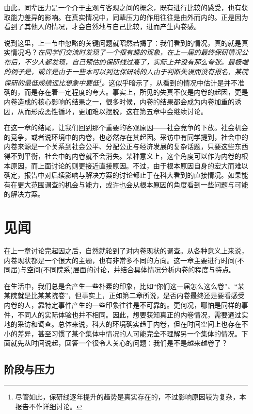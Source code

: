 \documentclass[UTF8,a4paper,fontset=windows,11pt,openany]{ctexbook}
\begin{document}
由此，同辈压力是一个介于主观与客观之间的概念，既有进行比较的感受，也有获取能力差异的影响。在真实情况中，同辈压力的作用往往是由外而内的。正是因为看到了其他人的情况，才会自然地与自己比较，进而产生内卷感。

说到这里，上一节中忽略的关键问题就昭然若揭了：我们看到的情况，真的就是真实情况吗？\emph{在同学们交流时发现了一个很有趣的现象，在上一届的最终保研情况公布后，不少人都发现，自己预估的保研线过高了，实际上并没有那么夸张。最极端的例子是，或许是由于一些本可以到达保研线的人由于判断失误而没有报名，某院保研的最低成绩远比想象中要低\footnote{尽管如此，保研线逐年提升的趋势是真实存在的，不过影响原因较为复杂，本报告不作详细讨论。}。}这似乎暗示了，从看到的情况中估计是并不准确的，而是存在着一定程度的夸大。事实上，所见的失真不仅是内卷的起因，更是内卷造成的核心影响的结果之一，很多时候，内卷的结果都会成为内卷加重的诱因，从而形成恶性循环，更加难以摆脱，这在第五章中会继续讨论。

在这一章的结尾，让我们回到那个重要的客观原因——社会竞争的下放。社会机会的竞争，或者说环境中的内卷，也必然存在其起因。采访中有同学提到，社会中的内卷来源是一个关系到社会公平、分配公正与经济发展的复杂话题，只要这些东西得不到平衡，社会中的内卷就不会消失。某种意义上，这个角度可以作为内卷的根本原因，而上面讨论的则更接近直接原因。不过，由于根本原因自身的宏大而难以确定，报告中对后续影响与解决方案的讨论都止于在科大看到的直接情况。如果能有在更大范围调查的机会与能力，或许也会从根本原因的角度看到一些问题与可能的解决方案。

\chapter{见闻}

在上一章讨论完起因之后，自然就轮到了对内卷现状的调查。从各种意义上来说，内卷现状都是一个很大的主题，也有非常多不同的方向。这一章主要进行时间(不同届)与空间(不同院系)层面的讨论，并结合具体情况分析内卷的程度与特点。

在生活中，我们总是会产生一些朴素的印象，比如“你们这一届怎么这么卷”、“某某院就是比某某院卷”，但事实上，正如第二章所说，是否内卷最终还是要看感受内卷的人，靠特定事件产生的一些印象往往是不可靠的。更何况，哪怕是同样的事件，不同人的实际体验也并不相同。因此，想要获知真正的内卷情况，需要通过实地的采访和调查。总体来说，科大的环境确实趋于内卷，但在时间空间上也存在不小的差异，甚至习惯了某个集体中情况的人可能完全不理解另一个集体的情况。下面就先从时间说起，回答一个很令人关心的问题：我们是不是越来越卷了？

\section{阶段与压力}
\end{document}
